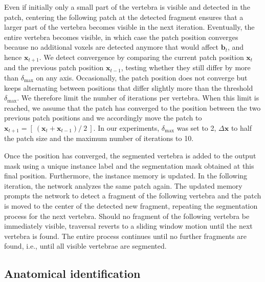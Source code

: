 \documentclass[authoryear,5p,final,times]{elsarticle}
\renewcommand{\vec}[1]{\bm{#1}}
\begin{document}
    Even if initially only a small part of the vertebra is visible and detected in the patch, centering the following patch at the detected fragment ensures that a larger part of the vertebra becomes visible in the next iteration. Eventually, the entire vertebra becomes visible, in which case the patch position converges because no additional voxels are detected anymore that would affect $\vec{b}_t$, and hence $\vec{x}_{t+1}$. We detect convergence by comparing the current patch position $\vec{x}_t$ and the previous patch position $\vec{x}_{t-1}$, testing whether they still differ by more than $\delta_\text{max}$ on any axis. Occasionally, the patch position does not converge but keeps alternating between positions that differ slightly more than the threshold $\delta_\text{max}$. We therefore limit the number of iterations per vertebra. When this limit is reached, we assume that the patch has converged to the position between the two previous patch positions and we accordingly move the patch to $
        \vec{x}_{t+1} =
        \left[ \ \left(
          \vec{x}_{t} + \vec{x}_{t-1}
        \right) /\ 2 \ \right]
    $. In our experiments, $\delta_\text{max}$ was set to \num{2}, $\Delta \vec{x}$ to half the patch size and the maximum number of iterations to \num{10}.
    
    Once the position has converged, the segmented vertebra is added to the output mask using a unique instance label and the segmentation mask obtained at this final position. Furthermore, the instance memory is updated. In the following iteration, the network analyzes the same patch again. The updated memory prompts the network to detect a fragment of the following vertebra and the patch is moved to the center of the detected new fragment, repeating the segmentation process for the next vertebra. Should no fragment of the following vertebra be immediately visible, traversal reverts to a sliding window motion until the next vertebra is found. The entire process continues until no further fragments are found, i.e., until all visible vertebrae are segmented.
    
    \subsection{Anatomical identification}
    \label{sec:method_identification}
    
\end{document}
